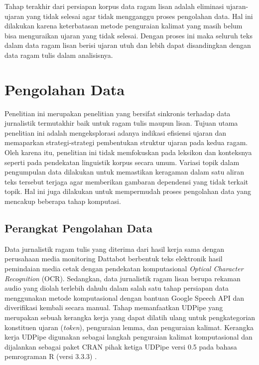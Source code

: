 Tahap terakhir dari persiapan korpus data ragam lisan adalah eliminasi ujaran-ujaran yang tidak selesai agar tidak mengganggu proses pengolahan data. Hal ini dilakukan karena keterbatasan metode penguraian kalimat yang masih belum bisa menguraikan ujaran yang tidak selesai. Dengan proses ini maka seluruh teks dalam data ragam lisan berisi ujaran utuh dan lebih dapat disandingkan dengan data ragam tulis dalam analisisnya.

\section{Pengolahan Data}

Penelitian ini merupakan penelitian yang bersifat sinkronis terhadap data jurnalistik termutakhir baik untuk ragam tulis maupun lisan. Tujuan utama penelitian ini adalah mengeksplorasi adanya indikasi efisiensi ujaran dan memaparkan strategi-strategi pembentukan struktur ujaran pada kedua ragam. Oleh karena itu, penelitian ini tidak memfokuskan pada leksikon dan konteksnya seperti pada pendekatan linguistik korpus secara umum. Variasi topik dalam pengumpulan data dilakukan untuk memastikan keragaman dalam satu aliran teks tersebut terjaga agar memberikan gambaran dependensi yang tidak terkait topik. Hal ini juga dilakukan untuk mempermudah proses pengolahan data yang mencakup beberapa tahap komputasi.

\subsection{Perangkat Pengolahan Data}
Data jurnalistik ragam tulis yang diterima dari hasil kerja sama dengan perusahaan media monitoring Dattabot berbentuk teks elektronik hasil pemindaian media cetak dengan pendekatan komputasional \textit{Optical Character Recognition} (OCR). Sedangkan, data jurnalistik ragam lisan berupa rekaman audio yang diolah terlebih dahulu dalam salah satu tahap persiapan data menggunakan metode komputasional dengan bantuan Google Speech API dan diverifikasi kembali secara manual. Tahap 
 memanfaatkan UDPipe \citep{udpipe2017} yang merupakan sebuah kerangka kerja yang dapat dilatih ulang untuk pengkategorian konstituen ujaran (\textit{token}), penguraian lemma, dan penguraian kalimat. Kerangka kerja UDPipe digunakan sebagai langkah penguraian kalimat komputasional dan dijalankan sebagai paket CRAN pihak ketiga UDPipe versi 0.5 \cite{udpipe2017manual} pada bahasa pemrograman R (versi 3.3.3) \citep{r2017project}. 

